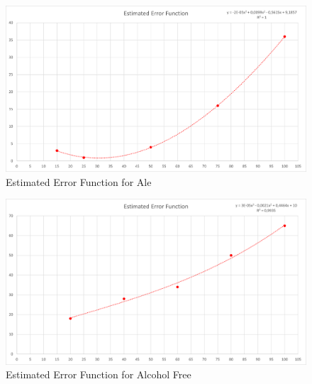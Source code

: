 \begin{figure}[H]
	\centering
	\includegraphics[width=1\linewidth]{images/errorfunction/ale.png}
	\caption{Estimated Error Function for Ale}
\end{figure}

\begin{figure}[H]
	\centering
	\includegraphics[width=1\linewidth]{images/errorfunction/alcohol_free.png}
	\caption{Estimated Error Function for Alcohol Free}
\end{figure}